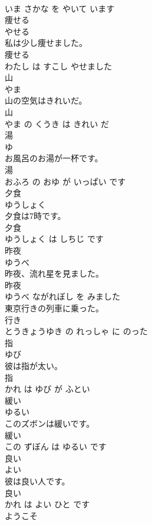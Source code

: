 \documentclass[8pt]{extreport}
\begin{document}
\begin{CJK}{UTF8}{min}
\\	いま さかな を やいて います			
\\	痩せる	
\\	やせる			
\\	私は少し痩せました。	
\\	痩せる 
\\	わたし は すこし やせました			
\\	山	
\\	やま			
\\	山の空気はきれいだ。	
\\	山 
\\	やま の くうき は きれい だ			
\\	湯	
\\	ゆ			
\\	お風呂のお湯が一杯です。	
\\	湯 
\\	おふろ の おゆ が いっぱい です			
\\	夕食	
\\	ゆうしょく			
\\	夕食は7時です。	
\\	夕食 
\\	ゆうしょく は しちじ です			
\\	昨夜	
\\	ゆうべ			
\\	昨夜、流れ星を見ました。	
\\	昨夜 
\\	ゆうべ ながれぼし を みました			
\\	東京行きの列車に乗った。	
\\	行き 
\\	とうきょうゆき の れっしゃ に のった			
\\	指	
\\	ゆび			
\\	彼は指が太い。	
\\	指 
\\	かれ は ゆび が ふとい			
\\	緩い	
\\	ゆるい			
\\	このズボンは緩いです。	
\\	緩い 
\\	この ずぼん は ゆるい です			
\\	良い	
\\	よい			
\\	彼は良い人です。	
\\	良い 
\\	かれ は よい ひと です			
\\	ようこそ	

\end{CJK}
\end{document}
